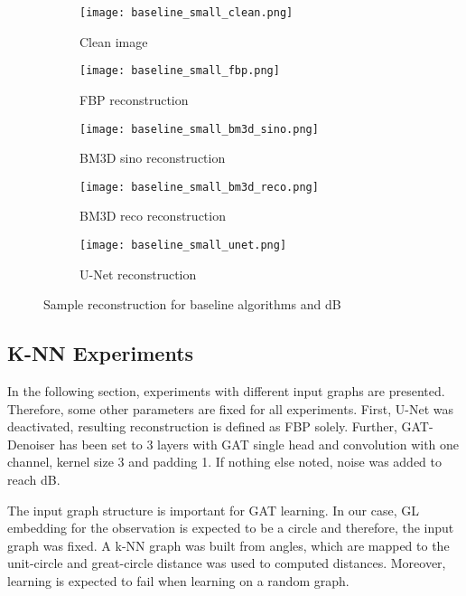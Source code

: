 \begin{figure}[H]
  \captionsetup[subfigure]{justification=centering}
  \centering
  \begin{subfigure}[t]{0.15\textwidth}
      \texttt{[image: baseline\_small\_clean.png]}
      \caption{Clean image}
  \end{subfigure}\hfill
  \begin{subfigure}[t]{0.15\textwidth}
    \texttt{[image: baseline\_small\_fbp.png]}
    \caption{FBP reconstruction}
  \end{subfigure}\hfill
  \begin{subfigure}[t]{0.15\textwidth}
    \texttt{[image: baseline\_small\_bm3d\_sino.png]}
    \caption{BM3D sino reconstruction}
  \end{subfigure}\hfill
  \begin{subfigure}[t]{0.15\textwidth}
    \texttt{[image: baseline\_small\_bm3d\_reco.png]}
    \caption{BM3D reco reconstruction}
  \end{subfigure}\hfill
  \begin{subfigure}[t]{0.15\textwidth}
    \texttt{[image: baseline\_small\_unet.png]}
    \caption{U-Net reconstruction}
  \end{subfigure}
  \caption{Sample reconstruction for baseline algorithms and  dB}
  \label{fig:baseline_small}
\end{figure}


 \subsection{K-NN Experiments}
  In the following section, experiments with different input graphs are presented.
  Therefore, some other parameters are fixed for all experiments.
  First, U-Net was deactivated, resulting reconstruction is defined as FBP solely.
  Further, GAT-Denoiser has been set to 3 layers with GAT single head and convolution 
  with one channel, kernel size 3 and padding 1. 
  If nothing else noted, noise was added to reach  dB.

  The input graph structure is important for GAT learning.
  In our case, GL embedding for the observation is expected to be a circle and therefore,
  the input graph was fixed. A k-NN graph was built from angles, which are mapped to
  the unit-circle and great-circle distance was used to computed distances.
  Moreover, learning is expected to fail when learning on a random graph.

